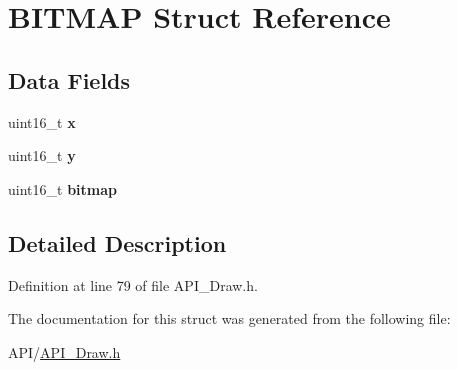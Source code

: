 \hypertarget{struct_b_i_t_m_a_p}{}\section{B\+I\+T\+M\+AP Struct Reference}
\label{struct_b_i_t_m_a_p}
\subsection*{Data Fields}
\begin{DoxyCompactItemize}
\item 
\mbox{\label{struct_b_i_t_m_a_p_a4dde988b1b2adba65ae3efa69f65d960}} 
uint16\+\_\+t {\bfseries x}
\item 
\mbox{\label{struct_b_i_t_m_a_p_ab0580f504a7428539be299fa71565f30}} 
uint16\+\_\+t {\bfseries y}
\item 
\mbox{\label{struct_b_i_t_m_a_p_a02b2be7b8ce086893453d390c5fdcf1d}} 
uint16\+\_\+t {\bfseries bitmap}
\end{DoxyCompactItemize}


\subsection{Detailed Description}


Definition at line 79 of file A\+P\+I\+\_\+\+Draw.\+h.



The documentation for this struct was generated from the following file\+:\begin{DoxyCompactItemize}
\item 
A\+P\+I/\hyperlink{_a_p_i___draw_8h}{A\+P\+I\+\_\+\+Draw.\+h}\end{DoxyCompactItemize}
